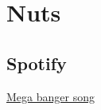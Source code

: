\chapter{Nuts}

\section{Spotify}

\href{https://open.spotify.com/track/5m4wFhsObPpSe6TyIP737u}{Mega banger song}
